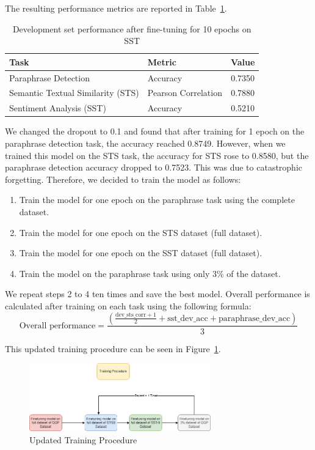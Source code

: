 The resulting performance metrics are reported in Table~\ref{tab:post_finetuning_metrics_SS3}.

\begin{table}[H]
    \centering
    \begin{tabular}{|l|l|c|}
    \hline
    \textbf{Task} & \textbf{Metric} & \textbf{Value} \\ \hline
    Paraphrase Detection & Accuracy & 0.7350 \\ \hline
    Semantic Textual Similarity (STS) & Pearson Correlation & 0.7880 \\ \hline
    Sentiment Analysis (SST) & Accuracy & 0.5210 \\ \hline
    \end{tabular}
    \caption{Development set performance after fine-tuning for 10 epochs on SST}
    \label{tab:post_finetuning_metrics_SS3}
\end{table}
We changed the dropout to 0.1 and found that after training for 1 epoch on the paraphrase detection task, the accuracy reached 0.8749. However, when we trained this model on the STS task, the accuracy for STS rose to 0.8580, but the paraphrase detection accuracy dropped to 0.7523. This was due to catastrophic forgetting. Therefore, we decided to train the model as follows:

\begin{enumerate}
    \item Train the model for one epoch on the paraphrase task using the complete dataset.
    \item Train the model for one epoch on the STS dataset (full dataset).
    \item Train the model for one epoch on the SST dataset (full dataset).
    \item Train the model on the paraphrase task using only 3\% of the dataset.
\end{enumerate}

We repeat steps 2 to 4 ten times and save the best model. Overall performance is calculated after training on each task using the following formula:
\[
\text{Overall performance} = \frac{\left( \frac{\text{dev\_sts\_corr} + 1}{2} + \text{sst\_dev\_acc} + \text{paraphrase\_dev\_acc} \right)}{3}
\]

This updated training procedure can be seen in Figure~\ref{fig:Training_Procedure}.

\begin{figure}[H]
    \centering
    \includegraphics[width=0.7\textwidth]{Figures/Training_Procedure.png}
    \caption{Updated Training Procedure}
    \label{fig:Training_Procedure}
\end{figure}


